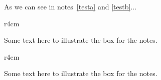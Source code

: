 \documentclass[dvipsnames]{article}
\newcounter{mynote}
\newcommand\StoryNote[3][]{%
     \begin{wrapfigure}{r}{4cm}
      \begin{mynote}[label=#3]
        #2
      \end{mynote}%
      \end{wrapfigure}%
}
\begin{document}
\lipsum*[2] As we can see in notes~\ref{testa} and \ref{testb}...
\begin{story}
\StoryNote{Some text here to illustrate the box for the notes.}{testa}
\lipsum[1]
\StoryNote{Some text here to illustrate the box for the notes.}{testb}
\lipsum[3]
\end{story}
\end{document}
